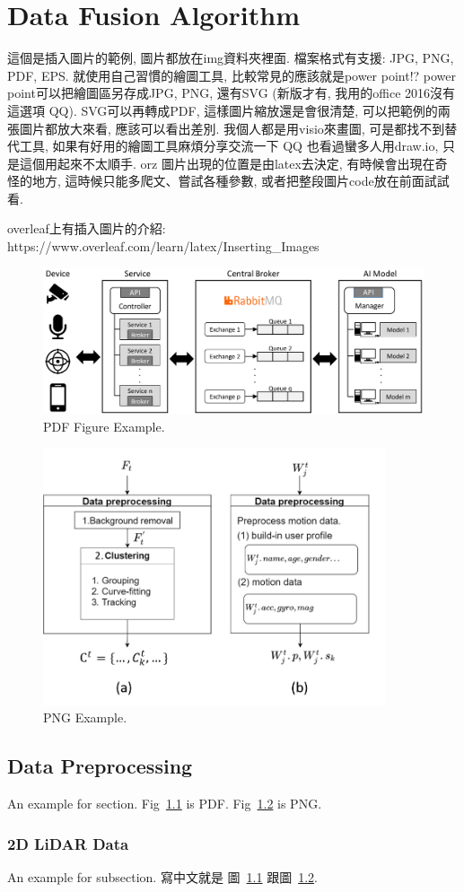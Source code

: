 \chapter{Data Fusion Algorithm}
\label{ch:method}

這個是插入圖片的範例, 圖片都放在img資料夾裡面. 檔案格式有支援: JPG, PNG, PDF, EPS. 就使用自己習慣的繪圖工具, 比較常見的應該就是power point!? power point可以把繪圖區另存成JPG, PNG, 還有SVG (新版才有, 我用的office 2016沒有這選項 QQ). SVG可以再轉成PDF, 這樣圖片縮放還是會很清楚, 可以把範例的兩張圖片都放大來看, 應該可以看出差別. 我個人都是用visio來畫圖, 可是都找不到替代工具, 如果有好用的繪圖工具麻煩分享交流一下 QQ 也看過蠻多人用draw.io, 只是這個用起來不太順手. orz
圖片出現的位置是由latex去決定, 有時候會出現在奇怪的地方, 這時候只能多爬文、嘗試各種參數, 或者把整段圖片code放在前面試試看.

overleaf上有插入圖片的介紹: https://www.overleaf.com/learn/latex/Inserting\_Images


\begin{figure}[htb]
  \centering
  \includegraphics[width=0.9\columnwidth]{img/1.system_architecture.pdf}
  \caption{PDF Figure Example.} 
  \label{fig:system_architecture}
\end{figure}

\begin{figure}[htb]
	\centering
	\includegraphics[width=0.9\textwidth]{img/data_preprocessing.png}
	\caption{PNG Example.}
	\label{fig:model}
\end{figure}


\section{Data Preprocessing}
\label{sec:SMA}
An example for section. Fig~\ref{fig:system_architecture} is PDF. Fig~\ref{fig:model} is PNG.


\subsection{2D LiDAR Data}
An example for subsection. 寫中文就是 圖~\ref{fig:system_architecture} 跟圖~\ref{fig:model}.

